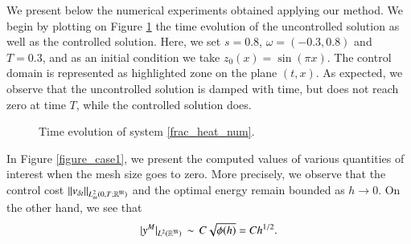 We present below the numerical experiments obtained applying our method. We begin by plotting on Figure \ref{sol_surf} the time evolution of the uncontrolled solution as well as the controlled solution. Here, we set $s=0.8$, $\omega=(-0.3,0.8)$ and $T=0.3$, and as an initial condition we take $z_0(x) = \sin(\pi x)$. The control domain is represented as highlighted zone on the plane $(t,x)$. As expected, we observe that the uncontrolled solution is damped with time, but does not reach zero at time $T$, while the controlled solution does. 

\begin{figure}[ht]
 \centering
% 
%
\hspace{1 cm}
\caption{Time evolution of system \eqref{frac_heat_num}.}\label{sol_surf}
\end{figure}

In Figure \ref{figure_case1}, we present the computed values of various quantities of interest when the mesh size goes to zero. More precisely, we observe that the control cost $\|v_{\delta t}\|_{L^2_{\delta t}(0,T;\mathbb R^{\mathfrak{M}})}$ and the optimal energy remain bounded as $h\to 0$. On the other hand, we see that 
\begin{align}\label{control_norm_behavior}
	|y^M|_{L^2(\mathbb{R}^{\mathfrak{M}})}\,\sim\,C\sqrt{\phi(h)}=Ch^{1/2}. 
\end{align}

